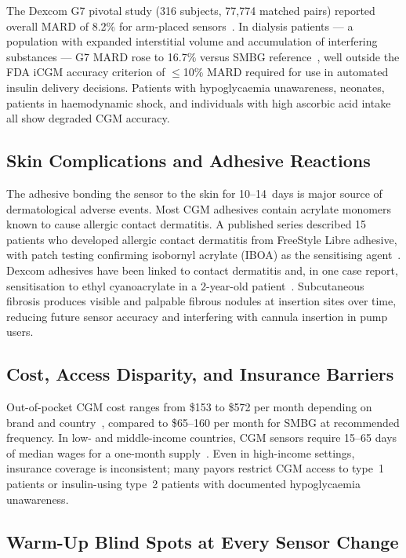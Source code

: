 The Dexcom G7 pivotal study (316 subjects, 77,774 matched pairs) reported overall MARD of 8.2\% for arm-placed sensors~\cite{g7pivotal}. In dialysis patients --- a population with expanded interstitial volume and accumulation of interfering substances --- G7 MARD rose to 16.7\% versus SMBG reference~\cite{dialysis2025}, well outside the FDA iCGM accuracy criterion of $\leq$10\% MARD required for use in automated insulin delivery decisions. Patients with hypoglycaemia unawareness, neonates, patients in haemodynamic shock, and individuals with high ascorbic acid intake all show degraded CGM accuracy.

\subsection*{Skin Complications and Adhesive Reactions}

The adhesive bonding the sensor to the skin for 10--14~days is major source of dermatological adverse events. Most CGM adhesives contain acrylate monomers known to cause allergic contact dermatitis. A published series described 15 patients who developed allergic contact dermatitis from FreeStyle Libre adhesive, with patch testing confirming isobornyl acrylate (IBOA) as the sensitising agent~\cite{dermo2019}. Dexcom adhesives have been linked to contact dermatitis and, in one case report, sensitisation to ethyl cyanoacrylate in a 2-year-old patient~\cite{dermo2019}. Subcutaneous fibrosis produces visible and palpable fibrous nodules at insertion sites over time, reducing future sensor accuracy and interfering with cannula insertion in pump users.

\subsection*{Cost, Access Disparity, and Insurance Barriers}

Out-of-pocket CGM cost ranges from \$153 to \$572 per month depending on brand and country~\cite{singlecare}, compared to \$65--160 per month for SMBG at recommended frequency. In low- and middle-income countries, CGM sensors require 15--65 days of median wages for a one-month supply~\cite{lmic2025}. Even in high-income settings, insurance coverage is inconsistent; many payors restrict CGM access to type~1 patients or insulin-using type~2 patients with documented hypoglycaemia unawareness.

\subsection*{Warm-Up Blind Spots at Every Sensor Change}

